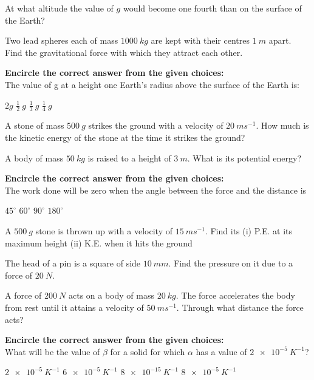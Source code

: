 \documentclass[14pt]{exam}
\begin{document}
\begin{questions}

\question[10] At what altitude the value of $g$ would become one fourth than on the surface of the Earth?

\question[10] Two lead spheres each of mass $1000 \ kg$ are kept with their centres $1 \ m$ apart. Find the gravitational force with which they attract each other.

\addpoints
\question[2] \textbf{Encircle the correct answer from the given choices:} \\
The value of g at a height one Earth's radius above the surface of the Earth is:
\addpoints
\begin{checkboxes}
\choice $2g$
\choice $\frac{1}{2} \ g$
\choice $\frac{1}{3} \ g$
\choice $\frac{1}{4} \ g$
\end{checkboxes}

\question[10] A stone of mass $500 \ g$ strikes the ground with a velocity of $20 \ ms^{-1}$. How much is the kinetic energy of the stone at the time it strikes the ground?
\addpoints

\question[5] A body of mass $50 \ kg$ is raised to a height of $3 \ m$. What is its potential energy?
\addpoints

\question[2] \textbf{Encircle the correct answer from the given choices:} \\
The work done will be zero when the angle between the force and the distance is
\addpoints
\begin{checkboxes}
\choice $45^{\circ}$
\choice $60^{\circ}$
\choice $90^{\circ}$
\choice $180^{\circ}$
\end{checkboxes}

\question[10] A $500 \ g$ stone is thrown up with a velocity of $15 \ ms^{-1}$. Find its (i) P.E. at its maximum height (ii) K.E. when it hits the ground
\addpoints

\question[5] The head of a pin is a square of side $10 \ mm$. Find the pressure on it due to a force of $20 \ N$.
\addpoints

\question[20] A force of $200 \ N$ acts on a body of mass $20 \ kg$. The force accelerates the body from rest until it attains a velocity of $50 \ ms^{-1}$. Through what distance the force acts?
\addpoints

\question[1] \textbf{Encircle the correct answer from the given choices:} \\
What will be the value of $\beta$ for a solid for which $\alpha$ has a value of $\num{2e-5} \ K^{-1}$?
\addpoints
\begin{checkboxes}
\choice $\num{2e-5} \ K^{-1}$
\choice $\num{6e-5} \ K^{-1}$
\choice $\num{8e-15} \ K^{-1}$
\choice $\num{8e-5} \ K^{-1}$
\end{checkboxes}


\end{questions}
\end{document}
